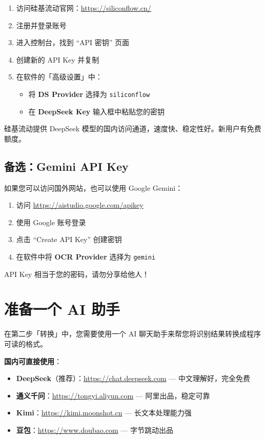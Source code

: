 \documentclass[UTF8,zihao=-4,openany]{ctexbook}
\begin{document}
\begin{enumerate}
	\item 访问硅基流动官网：\url{https://siliconflow.cn/}
	\item 注册并登录账号
	\item 进入控制台，找到 ``API 密钥'' 页面
	\item 创建新的 API Key 并复制
	\item 在软件的「高级设置」中：
	      \begin{itemize}
		      \item 将 \textbf{DS Provider} 选择为 \texttt{siliconflow}
		      \item 在 \textbf{DeepSeek Key} 输入框中粘贴您的密钥
	      \end{itemize}
\end{enumerate}

\begin{TipBox}
	硅基流动提供 DeepSeek 模型的国内访问通道，速度快、稳定性好。新用户有免费额度。
\end{TipBox}

\subsection{备选：Gemini API Key}

如果您可以访问国外网站，也可以使用 Google Gemini：
\begin{enumerate}
	\item 访问 \url{https://aistudio.google.com/apikey}
	\item 使用 Google 账号登录
	\item 点击 ``Create API Key'' 创建密钥
	\item 在软件中将 \textbf{OCR Provider} 选择为 \texttt{gemini}
\end{enumerate}

\begin{WarnBox}
	API Key 相当于您的密码，请勿分享给他人！
\end{WarnBox}

\section{准备一个 AI 助手}

在第二步「转换」中，您需要使用一个 AI 聊天助手来帮您将识别结果转换成程序可读的格式。

\textbf{国内可直接使用}：
\begin{itemize}
	\item \textbf{DeepSeek}（推荐）：\url{https://chat.deepseek.com} --- 中文理解好，完全免费
	\item \textbf{通义千问}：\url{https://tongyi.aliyun.com} --- 阿里出品，稳定可靠
	\item \textbf{Kimi}：\url{https://kimi.moonshot.cn} --- 长文本处理能力强
	\item \textbf{豆包}：\url{https://www.doubao.com} --- 字节跳动出品
\end{itemize}
\end{document}
